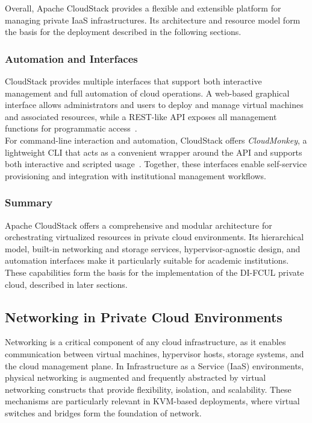 \documentclass[sigplan]{acmart}
\begin{document}
            Overall, Apache CloudStack provides a flexible and extensible platform for managing private IaaS infrastructures. Its architecture and resource model form the basis for the deployment described in the following sections.
    
    	\subsubsection{Automation and Interfaces}
    		CloudStack provides multiple interfaces that support both interactive management and full automation of cloud operations. A web-based graphical interface allows administrators and users to deploy and manage virtual machines and associated resources, while a REST-like API exposes all management functions for programmatic access~\cite{IntroductionApacheCloudStack}.\\
    
    		For command-line interaction and automation, CloudStack offers \textit{CloudMonkey}, a lightweight CLI that acts as a convenient wrapper around the API and supports both interactive and scripted usage~\cite{CloudStackCloudmonkeyCLI}. Together, these interfaces enable self-service provisioning and integration with institutional management workflows.
    
    	\subsubsection{Summary}
                Apache CloudStack offers a comprehensive and modular architecture for orchestrating virtualized resources in private cloud environments. Its hierarchical model, built-in networking and storage services, hypervisor-agnostic design, and automation interfaces make it particularly suitable for academic institutions. These capabilities form the basis for the implementation of the DI-FCUL private cloud, described in later sections.

    \subsection{Networking in Private Cloud Environments} \label{sec:background.networking}
        Networking is a critical component of any cloud infrastructure, as it enables communication between virtual machines, hypervisor hosts, storage systems, and the cloud management plane. In Infrastructure as a Service (IaaS) environments, physical networking is augmented and frequently abstracted by virtual networking constructs that provide flexibility, isolation, and scalability. These mechanisms are particularly relevant in KVM-based deployments, where virtual switches and bridges form the foundation of network.
        
\end{document}
